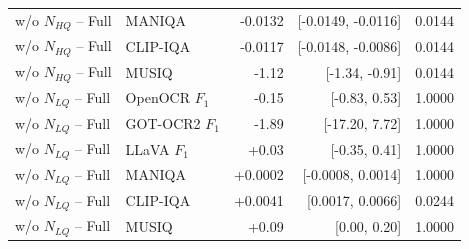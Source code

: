 \begin{longtable}{llrrr}
w/o $N_{HQ}$ -- Full & MANIQA & -0.0132 & [-0.0149, -0.0116] & 0.0144 \\
w/o $N_{HQ}$ -- Full & CLIP-IQA & -0.0117 & [-0.0148, -0.0086] & 0.0144 \\
w/o $N_{HQ}$ -- Full & MUSIQ & -1.12 & [-1.34, -0.91] & 0.0144 \\
w/o $N_{LQ}$ -- Full & OpenOCR $F_1$ & -0.15 & [-0.83, 0.53] & 1.0000 \\
w/o $N_{LQ}$ -- Full & GOT-OCR2 $F_1$ & -1.89 & [-17.20, 7.72] & 1.0000 \\
w/o $N_{LQ}$ -- Full & LLaVA $F_1$ & +0.03 & [-0.35, 0.41] & 1.0000 \\
w/o $N_{LQ}$ -- Full & MANIQA & +0.0002 & [-0.0008, 0.0014] & 1.0000 \\
w/o $N_{LQ}$ -- Full & CLIP-IQA & +0.0041 & [0.0017, 0.0066] & 0.0244 \\
w/o $N_{LQ}$ -- Full & MUSIQ & +0.09 & [0.00, 0.20] & 1.0000 \\
\midrule
\end{longtable}
\endgroup
